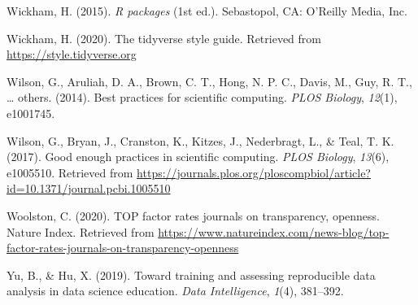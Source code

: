 \documentclass[12pt,twoside]{reedthesis}
\newenvironment{CSLReferences}%
  {}%
  {\par}
\begin{document}
\begin{CSLReferences}{1}{0}
\leavevmode\hypertarget{ref-hadley-packages}{}%
Wickham, H. (2015). \emph{R packages} (1st ed.). Sebastopol, CA: O'Reilly Media, Inc.

\leavevmode\hypertarget{ref-tidy-style}{}%
Wickham, H. (2020). The tidyverse style guide. Retrieved from \url{https://style.tidyverse.org}

\leavevmode\hypertarget{ref-wilson2014best}{}%
Wilson, G., Aruliah, D. A., Brown, C. T., Hong, N. P. C., Davis, M., Guy, R. T., \ldots{} others. (2014). Best practices for scientific computing. \emph{PLOS Biology}, \emph{12}(1), e1001745.

\leavevmode\hypertarget{ref-wilson2017good}{}%
Wilson, G., Bryan, J., Cranston, K., Kitzes, J., Nederbragt, L., \& Teal, T. K. (2017). Good enough practices in scientific computing. \emph{PLOS Biology}, \emph{13}(6), e1005510. Retrieved from \url{https://journals.plos.org/ploscompbiol/article?id=10.1371/journal.pcbi.1005510}

\leavevmode\hypertarget{ref-top-guidelines}{}%
Woolston, C. (2020). TOP factor rates journals on transparency, openness. Nature Index. Retrieved from \url{https://www.natureindex.com/news-blog/top-factor-rates-journals-on-transparency-openness}

\leavevmode\hypertarget{ref-yu2019toward}{}%
Yu, B., \& Hu, X. (2019). Toward training and assessing reproducible data analysis in data science education. \emph{Data Intelligence}, \emph{1}(4), 381--392.

\end{CSLReferences}

\end{document}
